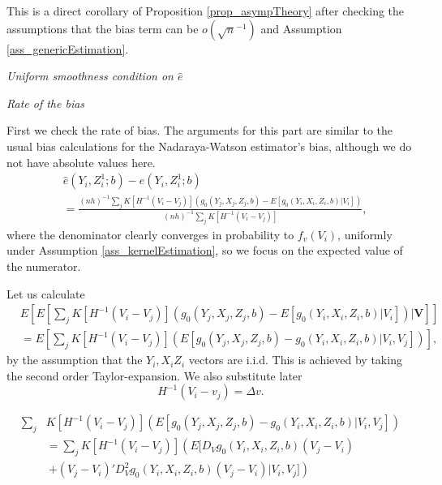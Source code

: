 \documentclass{article}
\theoremstyle{definition}
\theoremstyle{remark}
\begin{document}
This is a direct corollary of Proposition \ref{prop_asympTheory} after checking the assumptions that the bias term can be $o(\sqrt{n}^{-1})$ and Assumption \ref{ass_genericEstimation}.

\emph{Uniform smoothness condition on $\hat{e}$}


\emph{Rate of the bias}

First we check the rate of bias. The arguments for this part are similar to the usual bias calculations for the Nadaraya-Watson estimator's bias, although we do not have absolute values here. 
\begin{align} \label{eq_cor2Bias}
&\hat{e}(Y_i, Z_i^1; b)-e(Y_i, Z_i^1; b) \\
&= \frac{(nh)^{-1}\sum_j K[H^{-1}(V_i-V_j)] \left(g_0(Y_j, X_j, Z_j, b)-E[g_0(Y_i, X_i, Z_i, b)|V_i]\right)}{(nh)^{-1}\sum_j K[H^{-1}(V_i-V_j)]}, \nonumber
\end{align}
where the denominator clearly converges in probability to $f_v(V_i)$, uniformly under Assumption \ref{ass_kernelEstimation}, so we focus on the expected value of the numerator.

Let us calculate
\begin{align}
&E\left[E\left[\sum_j K[H^{-1}(V_i-V_j)] \left(g_0(Y_j, X_j, Z_j, b)-E[g_0(Y_i, X_i, Z_i, b)|V_i]\right)|\mathbf{V}\right]\right] \nonumber \\
&=E\left[\sum_j K[H^{-1}(V_i-V_j)] \left(E[g_0(Y_j, X_j, Z_j, b)-g_0(Y_i, X_i, Z_i, b)|V_i, V_j]\right)\right],
\end{align}
by the assumption that the $Y_i,X_iZ_i$ vectors are i.i.d. This is achieved by taking the second order Taylor-expansion. We also substitute later
\[H^{-1}(V_i-v_j) = \Delta v.
\]

\begin{align}
\sum_j &K[H^{-1}(V_i-V_j)] \left(E[g_0(Y_j, X_j, Z_j, b)-g_0(Y_i, X_i, Z_i, b)|V_i, V_j]\right)  \\
&=\sum_j K[H^{-1}(V_i-V_j)] \left(E[D_V g_0(Y_i, X_i, Z_i, b)(V_j-V_i) \right. \nonumber \\
& \ \left. + (V_j-V_i)' D^2_{V}g_0(Y_i, X_i, Z_i, b) (V_j-V_i)|V_i, V_j]\right) \nonumber
\end{align}
\end{document}
